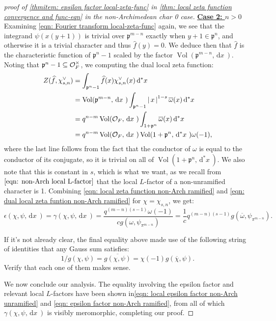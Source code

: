 \documentclass[11pt, x11names]{book}
\newcommand{\pp}{\mathfrak{p}}
\renewcommand{\bar}[1]{\overline{#1}}
\newcommand{\abs}[1]{\left| \, #1  \,\right|}
\renewcommand{\hat}{\widehat}
\newcommand{\dx}{\, \mathrm{d}x \ }
\renewcommand{\d}[1]{\, \mathrm{d}#1 \ }
\DeclareMathOperator{\vol}{Vol}
\begin{document}
\begin{proof}[proof of \ref{thmitem: epsilon factor local-zeta-func} in \ref{thm: local zeta function convergence and func-eqn} in the non-Archimedean char 0 case]
\textbf{\underline{Case 2: $n > 0$}}\\
Examining \ref{eqn: Fourier transform local-zeta-func} again, we see that the integrand $\psi(x(y+1))$ is trivial over $\pp^{m-n}$ exactly when $y + 1 \in \pp^n$, and otherwise it is a trivial character and thus $\hat{f}(y) = 0$. We deduce then that $\hat{f}$ is the characteristic function of $\pp^n - 1$ scaled by the factor $\vol(\pp^{m-n}, \dx)$. Noting that $\pp^n - 1 \subseteq \calo_F^\times$, we computing the dual local zeta function:
\begin{align}
\label{eqn: dual local zeta funtion non-Arch ramified}
    Z(\hat{f}, \chi^\lor_{s, n}) &= \int_{\pp^n - 1} \hat{f}(x) \chi^\lor_{s, n}(x) \d{^*x} \nonumber \\
    &= \vol(\pp^{m-n}, \dx) \int_{\pp^n - 1} \abs{x}^{1-s} \bar{\omega}(x) \d{^*x} \nonumber \\
    &= q^{n-m} \vol(\calo_F, \dx) \int_{1 + \pp^n} \bar{\omega}(x) \d{^*x} \nonumber \\
    &= q^{n-m} \vol(\calo_F, \dx) \vol(1 + \pp^n, \d{^*x}) \omega(-1),
\end{align}
where the last line follows from the fact that the conductor of $\omega$ is equal to the conductor of its conjugate, so it is trivial on all of $\vol(1 + \pp^n, \d{^*x})$. We also note that this is constant in $s$, which is what we want, as we recall from $\ref{eqn: non-Arch local L-factor}$ that the local $L$-factor of a non-unramified character is 1. Combining \ref{eqn: local zeta function non-Arch ramified} and \ref{eqn: dual local zeta funtion non-Arch ramified} for $\chi = \chi_{s, n}$, we get:
\begin{equation}
\label{eqn: epsilon factor non-Arch ramified}
    \epsilon(\chi, \psi, \dx) = \gamma(\chi, \psi, \dx) = \frac{q^{(m-n)(s-1)} \omega(-1)}{ c g( \omega, \psi_{\pi^{m-n}})} = \frac{1}{c}q^{(m-n)(s-1)}g(\bar{\omega}, \psi_{\pi^{m-n}}).
\end{equation}
\begin{sanitycheck}
    If it's not already clear, the final equality above made use of the following string of identities that any Gauss sum satisfies:
    \begin{equation*}
        1/g(\chi, \psi) = \bar{g(\chi, \psi)} = \chi(-1) g(\bar{\chi}, \psi).
    \end{equation*}
    Verify that each one of them makes sense.
\end{sanitycheck}

We now conclude our analysis. The equality involving the epsilon factor and relevant local $L$-factors have been shown in\ref{eqn: local epsilon factor non-Arch unramified} and \ref{eqn: epsilon factor non-Arch ramified}, from all of which $\gamma(\chi, \psi, \dx)$ is visibly meromorphic, completing our proof.
\end{proof}
\end{document}
